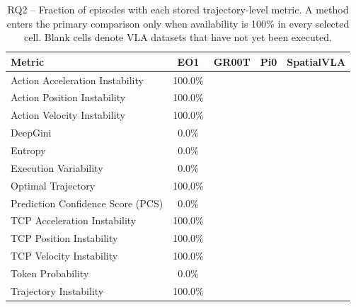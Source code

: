 \begin{table}[t]
\centering
\caption{RQ2 -- Fraction of episodes with each stored trajectory-level metric. A method enters the primary comparison only when availability is 100\% in every selected cell. Blank cells denote VLA datasets that have not yet been executed.}
\label{tab:rq2-metric-availability}
{\scriptsize
\begin{tabular}{lcccc}
\toprule
Metric & EO1 & GR00T & Pi0 & SpatialVLA \\
\midrule
Action Acceleration Instability & 100.0\% &  &  &  \\
Action Position Instability & 100.0\% &  &  &  \\
Action Velocity Instability & 100.0\% &  &  &  \\
DeepGini & 0.0\% &  &  &  \\
Entropy & 0.0\% &  &  &  \\
Execution Variability & 0.0\% &  &  &  \\
Optimal Trajectory & 100.0\% &  &  &  \\
Prediction Confidence Score (PCS) & 0.0\% &  &  &  \\
TCP Acceleration Instability & 100.0\% &  &  &  \\
TCP Position Instability & 100.0\% &  &  &  \\
TCP Velocity Instability & 100.0\% &  &  &  \\
Token Probability & 0.0\% &  &  &  \\
Trajectory Instability & 100.0\% &  &  &  \\
\bottomrule
\end{tabular}
}
\end{table}
